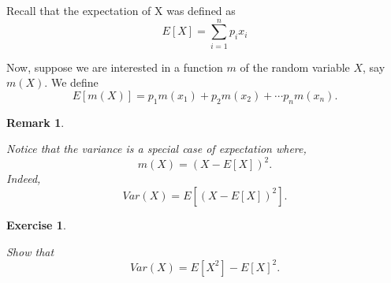\documentclass[smaller, handout]{beamer}\usepackage[]{graphicx}\usepackage[]{color}
\newtheorem{remark}{Remark}[section]
\newtheorem{exercise}{Exercise}[section]
\begin{document}
\begin{frame}{\secname}%

Recall that the expectation of X was defined as
\begin{equation*}
E\left[ X\right] = \sum_{i=1}^{n} p_i x_i
\end{equation*}

Now, suppose we are interested in a function $m$ of the random variable $X$, say $m(X)$. We define
\begin{equation*}
E\left[ m\left( X\right) \right] =p_{1}m\left( x_{1}\right) +p_{2}m\left(
x_{2}\right) +\cdots p_{n}m\left( x_{n}\right).
\end{equation*}
\begin{remark}
\begin{footnotesize}
Notice that the variance is a special case of expectation where,
\begin{equation*}
m(X)=(X-E\left[ X\right] )^{2}.
\end{equation*}
Indeed,
\begin{equation*}
Var\left( X\right) =E\left[ (X-E\left[ X\right] )^{2}\right].
\end{equation*}
\end{footnotesize}
\vspace{-0.3cm}
\end{remark}

\begin{exercise}
\begin{footnotesize}
Show that
\begin{equation*}
Var\left( X\right) =E\left[ X^{2}\right] -E\left[ X\right] ^{2}.
\end{equation*}
\end{footnotesize}
\vspace{-0.3cm}
\end{exercise}

\end{frame}
\end{document}
